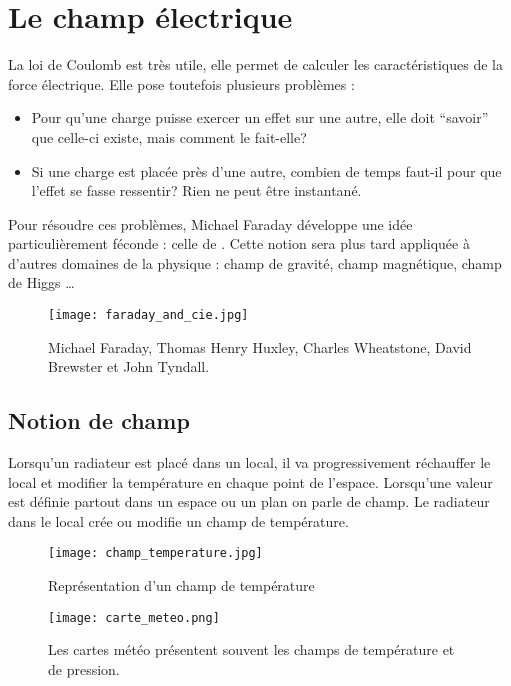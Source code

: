 \chapter{Le champ électrique}
La loi de Coulomb est très utile, elle permet de calculer les caractéristiques de la force électrique. Elle pose toutefois plusieurs problèmes :
\begin{itemize}[label=\textbullet]
    \item Pour qu'une charge puisse exercer un effet sur une autre, elle doit \enquote{savoir} que celle-ci existe, mais comment le fait-elle?
    \item Si une charge est placée près d'une autre, combien de temps faut-il pour que l'effet se fasse ressentir? Rien ne peut être instantané.
\end{itemize}

Pour résoudre ces problèmes, Michael Faraday développe une idée particulièrement féconde : celle de . Cette notion sera plus tard appliquée à d'autres domaines de la physique : champ de gravité, champ magnétique, champ de Higgs \ldots

\begin{figure}[!ht]
    \centering
    \texttt{[image: faraday\_and\_cie.jpg]}
    \caption{Michael Faraday, Thomas Henry Huxley, Charles Wheatstone, David Brewster et John Tyndall.}
    \label{club5}
\end{figure}


\newpage

\section{Notion de champ}
Lorsqu'un radiateur est placé dans un local, il va progressivement réchauffer le local et modifier la température en chaque point de l'espace.
Lorsqu'une valeur est définie partout dans un espace ou un plan on parle de champ. Le radiateur dans le local crée ou modifie un champ de température.


\begin{figure}[!ht]
    \centering
    \centering
    \texttt{[image: champ\_temperature.jpg]}
    \caption{Représentation d'un champ de température}
    \label{champ_temperature}
\end{figure}
\begin{figure}[!ht]
    \centering
    \texttt{[image: carte\_meteo.png]}
    \caption{Les cartes météo présentent souvent les champs de température et de pression.}
    \label{carte_meteo}
\end{figure}




